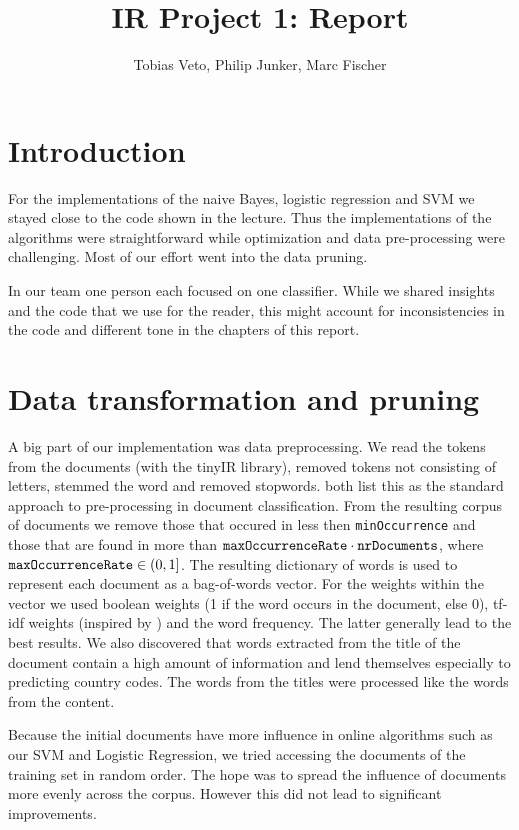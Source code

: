 \documentclass{article}
\title{IR Project 1: Report}
\author{Tobias Veto, Philip Junker, Marc Fischer}
\begin{document}
\section*{Introduction}
For the implementations of the naive Bayes, logistic regression and SVM we stayed close to the code shown in the lecture. Thus the implementations of the algorithms were straightforward while optimization and data pre-processing were challenging. Most of our effort went into the data pruning.

In our team one person each focused on one classifier. While we shared insights and the code that we use for the reader, this might account for inconsistencies in the code and different tone in the chapters of this report.

\vspace{-2mm}
\section*{Data transformation and pruning}
A big part of our implementation was data preprocessing. We read the tokens from the documents (with the tinyIR library), removed tokens not consisting of letters, stemmed the word and removed stopwords. \cite{joachims_text_1998,ozgur_text_2005} both list this as the standard approach to pre-processing in document classification. From the resulting corpus of documents we remove those that occured in less then \texttt{minOccurrence} and those that are found in more than $\text{\texttt{maxOccurrenceRate}} \cdot \text{\texttt{nrDocuments}}$, where $\text{\texttt{maxOccurrenceRate}} \in (0, 1]$.
The resulting dictionary of words is used to represent each document as a bag-of-words vector. For the weights within the vector we used boolean weights (1 if the word occurs in the document, else 0), tf-idf weights (inspired by \cite{ozgur_text_2005}) and the word frequency. The latter generally lead to the best results.
We also discovered  that words extracted from the title of the document contain a high amount of information and lend themselves especially to predicting country codes. The words from the titles were processed like the words from the content.

Because the initial documents have more influence in online algorithms such as our SVM and Logistic Regression, we tried accessing the documents of the training set in random order. The hope was to spread the influence of documents more evenly across the corpus. However this did not lead to significant improvements.
\end{document}
